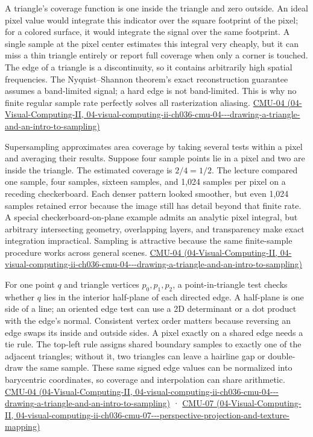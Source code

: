 A triangle's coverage function is one inside the triangle and zero outside. An ideal pixel value would integrate this indicator over the square footprint of the pixel; for a colored surface, it would integrate the signal over the same footprint. A single sample at the pixel center estimates this integral very cheaply, but it can miss a thin triangle entirely or report full coverage when only a corner is touched. The edge of a triangle is a discontinuity, so it contains arbitrarily high spatial frequencies. The Nyquist--Shannon theorem's exact reconstruction guarantee assumes a band-limited signal; a hard edge is not band-limited. This is why no finite regular sample rate perfectly solves all rasterization aliasing. \href{../04-Visual-Computing-II/main.pdf\#nameddest=04-visual-computing-ii-ch036-cmu-04---drawing-a-triangle-and-an-intro-to-sampling}{CMU-04 (04-Visual-Computing-II, 04-visual-computing-ii-ch036-cmu-04-\/-\/-drawing-a-triangle-and-an-intro-to-sampling)}

Supersampling approximates area coverage by taking several tests within a pixel and averaging their results. Suppose four sample points lie in a pixel and two are inside the triangle. The estimated coverage is \(2/4=1/2\). The lecture compared one sample, four samples, sixteen samples, and 1,024 samples per pixel on a receding checkerboard. Each denser pattern looked smoother, but even 1,024 samples retained error because the image still has detail beyond that finite rate. A special checkerboard-on-plane example admits an analytic pixel integral, but arbitrary intersecting geometry, overlapping layers, and transparency make exact integration impractical. Sampling is attractive because the same finite-sample procedure works across general scenes. \href{../04-Visual-Computing-II/main.pdf\#nameddest=04-visual-computing-ii-ch036-cmu-04---drawing-a-triangle-and-an-intro-to-sampling}{CMU-04 (04-Visual-Computing-II, 04-visual-computing-ii-ch036-cmu-04-\/-\/-drawing-a-triangle-and-an-intro-to-sampling)}

For one point \(q\) and triangle vertices \(p_0,p_1,p_2\), a point-in-triangle test checks whether \(q\) lies in the interior half-plane of each directed edge. A half-plane is one side of a line; an oriented edge test can use a 2D determinant or a dot product with the edge's normal. Consistent vertex order matters because reversing an edge swaps its inside and outside sides. A pixel exactly on a shared edge needs a tie rule. The top-left rule assigns shared boundary samples to exactly one of the adjacent triangles; without it, two triangles can leave a hairline gap or double-draw the same sample. These same signed edge values can be normalized into barycentric coordinates, so coverage and interpolation can share arithmetic. \href{../04-Visual-Computing-II/main.pdf\#nameddest=04-visual-computing-ii-ch036-cmu-04---drawing-a-triangle-and-an-intro-to-sampling}{CMU-04 (04-Visual-Computing-II, 04-visual-computing-ii-ch036-cmu-04-\/-\/-drawing-a-triangle-and-an-intro-to-sampling)} · \href{../04-Visual-Computing-II/main.pdf\#nameddest=04-visual-computing-ii-ch036-cmu-07---perspective-projection-and-texture-mapping}{CMU-07 (04-Visual-Computing-II, 04-visual-computing-ii-ch036-cmu-07-\/-\/-perspective-projection-and-texture-mapping)}

